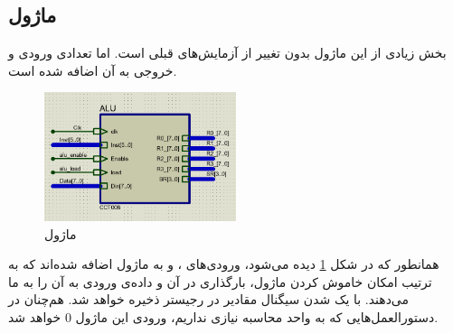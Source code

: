\documentclass[12pt,onecolumn,a4paper,fleqn]{article}
\begin{document}
\subsection{ماژول }
بخش زیادی از این ماژول بدون تغییر از آزمایش‌های قبلی است. اما تعدادی ورودی و خروجی به آن اضافه شده است.
\begin{figure}[H]
	\centering
	\includegraphics[width=0.5\textwidth]{source/alu_interface.png}
	\caption{ماژول }
	\label{fig:alu-interface}
\end{figure}
همانطور که در شکل \ref{fig:alu-interface} دیده می‌شود، ورودی‌های 
،
و
به ماژول اضافه شده‌اند که به ترتیب امکان خاموش کردن ماژول، بارگذاری در آن و داده‌ی ورودی به آن را به ما می‌دهند. با یک شدن سیگنال  مقادیر  در رجیستر 
ذخیره خواهد شد. هم‌چنان در دستورالعمل‌هایی که به واحد محاسبه نیازی نداریم، ورودی 
این ماژول $0$ خواهد شد.
\end{document}
